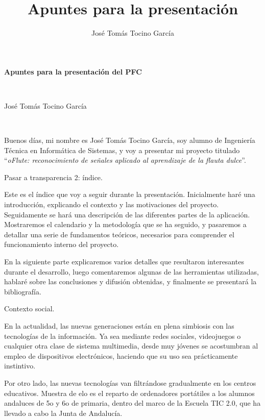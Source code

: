 \documentclass[landscape]{article}
\title{Apuntes para la presentación}
\author{José Tomás Tocino García}
\date{}
\newenvironment{nota}
{%
\begin{framed} \noindent\itshape
}
{%
\end{framed}\vspace{-0.5cm} }
\begin{document}
\pagestyle{empty}
\begin{multicols*}{2}

\begin{center}
  \begin{Large}\textbf{Apuntes para la presentación del PFC}\end{Large}\\
  \begin{large}José Tomás Tocino García\end{large}\\[0.1cm]
\end{center}

Buenos días, mi nombre es José Tomás Tocino García, soy alumno de Ingeniería
Técnica en Informática de Sistemas, y voy a presentar mi proyecto titulado
``\textit{oFlute: reconocimiento de señales aplicado al aprendizaje de la flauta
  dulce}''.

\begin{nota}
  Pasar a transparencia 2: índice.
\end{nota}

Este es el índice que voy a seguir durante la presentación. Inicialmente haré
una introducción, explicando el contexto y las motivaciones del
proyecto. Seguidamente se hará una descripción de las diferentes partes de la
aplicación. Mostraremos el calendario y la metodología que se ha seguido, y
pasaremos a detallar una serie de fundamentos teóricos, necesarios para
comprender el funcionamiento interno del proyecto.

En la siguiente parte explicaremos varios detalles que resultaron interesantes
durante el desarrollo, luego comentaremos algunas de las herramientas
utilizadas, hablaré sobre las conclusiones y difusión obtenidas, y finalmente se
presentará la bibliografía.

\begin{nota}
  Contexto social.
\end{nota}

En la actualidad, las nuevas generaciones están en plena simbiosis con las
tecnologías de la información. Ya sea mediante redes sociales, videojuegos o
cualquier otra clase de sistema multimedia, desde muy jóvenes se acostumbran al
empleo de dispositivos electrónicos, haciendo que su uso sea prácticamente
instintivo.

 Por otro lado, las nuevas tecnologías van filtrándose gradualmente en los
centros educativos. Muestra de elo es el reparto de ordenadores portátiles a los
alumnos andaluces de 5o y 6o de primaria, dentro del marco de la Escuela TIC
2.0, que ha llevado a cabo la Junta de Andalucía.


\end{multicols*}
\end{document}
